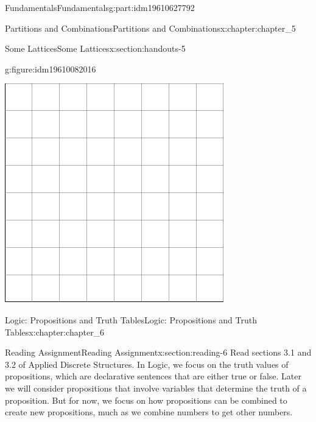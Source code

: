 \documentclass[oneside,10pt,]{book}
\numberwithin{equation}{section}
\begin{document}
\begin{partptx}{Fundamentals}{}{Fundamentals}{}{}{g:part:idm19610627792}
\begin{chapterptx}{Partitions and Combinations}{}{Partitions and Combinations}{}{}{x:chapter:chapter_5}
\begin{sectionptx}{Some Lattices}{}{Some Lattices}{}{}{x:section:handouts-5}
\begin{figureptx}{}{g:figure:idm19610082016}{}
\begin{image}{0.175}{0.65}{0.175}
\includegraphics[width=\linewidth]{images/graphpaper8.png}
\end{image}%
\tcblower
\end{figureptx}%
\end{sectionptx}
\end{chapterptx}
%
\typeout{************************************************}
\typeout{************************************************}
%
\begin{chapterptx}{Logic: Propositions and Truth Tables}{}{Logic: Propositions and Truth Tables}{}{}{x:chapter:chapter_6}
%
%
%
\typeout{************************************************}
\typeout{************************************************}
%
\begin{sectionptx}{Reading Assignment}{}{Reading Assignment}{}{}{x:section:reading-6}
Read sections 3.1 and 3.2 of Applied Discrete Structures.  In Logic, we focus on the truth values of propositions, which are declarative sentences that are either true or false.  Later we will consider propositions that involve variables that determine the truth of a proposition. But for now, we focus on how propositions can be combined to create new propositions, much as we combine numbers to get other numbers.%

\end{sectionptx}
\end{chapterptx}
\end{partptx}
\end{document}
